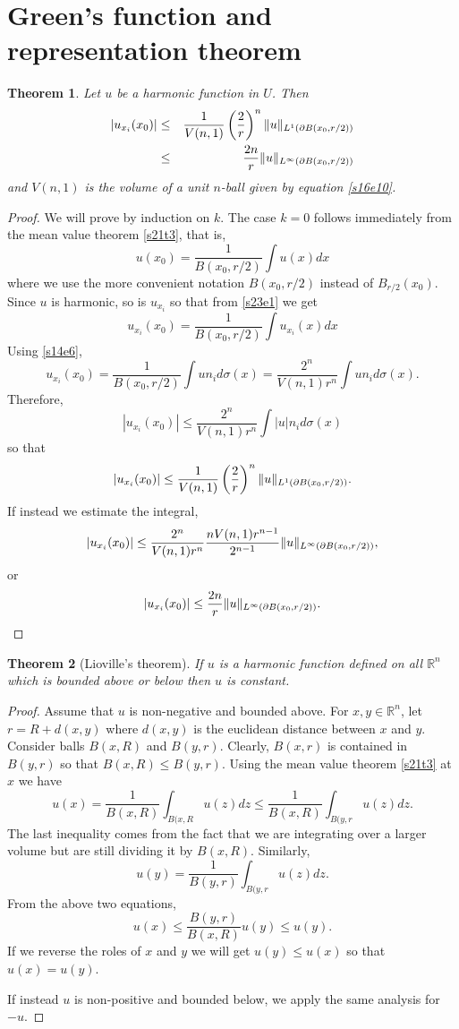 \documentclass{article}
\DeclarePairedDelimiter\norm{\lVert}{\rVert}
\theoremstyle{plain}
\newtheorem{thm}{Theorem}
\numberwithin{thm}{section}
\theoremstyle{plain}
\numberwithin{prop}{section}
\theoremstyle{definition}
\numberwithin{defn}{section}
\theoremstyle{remark}
\numberwithin{equation}{section}
\begin{document}
\section{Green's function and representation theorem}\label{s23}
\begin{thm}\label{s23t1}
Let $u$ be a harmonic function in $U$. Then
\begin{eqnarray*}
|u_{x_i}(x_0)| &\le& \frac{1}{V(n, 1)}\left(\frac{2}{r}\right)^n\norm{u}_{L^1(\partial B(x_0, r/2))} \\
 &\le& \frac{2n}{r}\norm{u}_{L^\infty(\partial B(x_0, r/2))}
\end{eqnarray*}
and $V(n, 1)$ is the volume of a unit $n$-ball given by equation \eqref{s16e10}.
\end{thm}
\begin{proof}
We will prove by induction on $k$. The case $k = 0$ follows immediately from the mean value theorem \ref{s21t3},
that is,
\begin{equation}\label{s23e1}
u(x_0) = \frac{1}{B(x_0, r/2)}\int u(x)dx
\end{equation}
where we use the more convenient notation $B(x_0, r/2)$ instead of $B_{r/2}(x_0)$. Since $u$ is harmonic, so is 
$u_{x_i}$ so that from \eqref{s23e1} we get
\[
u_{x_i}(x_0) = \frac{1}{B(x_0, r/2)}\int u_{x_i}(x)dx
\]
Using \eqref{s14e6},
\[
u_{x_i}(x_0) = \frac{1}{B(x_0, r/2)}\int un_i d\sigma(x) = \frac{2^n}{V(n, 1)r^n}\int un_i d\sigma(x).
\]
Therefore,
\[
|u_{x_i}(x_0)| \le \frac{2^n}{V(n, 1)r^n}\int |u|n_i d\sigma(x)
\]
so that
\[
|u_{x_i}(x_0)| \le \frac{1}{V(n, 1)}\left(\frac{2}{r}\right)^n\norm{u}_{L^1(\partial B(x_0, r/2))}.
\]
If instead we estimate the integral,
\[
|u_{x_i}(x_0)| \le \frac{2^n}{V(n, 1)r^n}\frac{nV(n, 1)r^{n-1}}{2^{n-1}}\norm{u}_{L^\infty(\partial B(x_0, r/2))},
\]
or
\[
|u_{x_i}(x_0)| \le \frac{2n}{r}\norm{u}_{L^\infty(\partial B(x_0, r/2))}.
\]
\end{proof}

\begin{thm}[Lioville's theorem]\label{s23t2}
If $u$ is a harmonic function defined on all $\mathbb{R}^n$ which is bounded above or below then $u$ is constant.
\end{thm}
\begin{proof}
Assume that $u$ is non-negative and bounded above. For $x, y \in \mathbb{R}^n$, let $r = R + d(x, y)$ where 
$d(x, y)$ is the euclidean distance between $x$ and $y$. Consider balls $B(x, R)$ and $B(y, r)$. Clearly, $B(x, r)$
is contained in $B(y, r)$ so that $B(x, R) \le B(y, r)$. Using the mean value theorem \ref{s21t3} at $x$ we have
\[
u(x) = \frac{1}{B(x, R)} \int_{B(x, R} u(z)dz \le \frac{1}{B(x, R)}\int_{B(y, r} u(z)dz.
\]
The last inequality comes from the fact that we are integrating over a larger volume but are still dividing it by
$B(x, R)$. Similarly,
\[
u(y) = \frac{1}{B(y, r)}\int_{B(y, r} u(z)dz.
\]
From the above two equations,
\[
u(x) \le \frac{B(y, r)}{B(x, R)}u(y) \le u(y).
\]
If we reverse the roles of $x$ and $y$ we will get $u(y) \le u(x)$ so that $u(x) = u(y)$.

If instead $u$ is non-positive and bounded below, we apply the same analysis for $-u$.
\end{proof}
\end{document}
